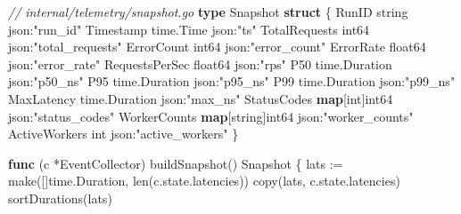 \documentclass[
]{article}
\newenvironment{Shaded}{}{}
\newcommand{\BuiltInTok}[1]{\textcolor[rgb]{0.00,0.50,0.00}{#1}}
\newcommand{\CommentTok}[1]{\textcolor[rgb]{0.38,0.63,0.69}{\textit{#1}}}
\newcommand{\DataTypeTok}[1]{\textcolor[rgb]{0.56,0.13,0.00}{#1}}
\newcommand{\KeywordTok}[1]{\textcolor[rgb]{0.00,0.44,0.13}{\textbf{#1}}}
\newcommand{\NormalTok}[1]{#1}
\newcommand{\OperatorTok}[1]{\textcolor[rgb]{0.40,0.40,0.40}{#1}}
\newcommand{\StringTok}[1]{\textcolor[rgb]{0.25,0.44,0.63}{#1}}
\begin{document}
\begin{Shaded}
\begin{Highlighting}[]
\CommentTok{// internal/telemetry/snapshot.go}
\KeywordTok{type}\NormalTok{ Snapshot }\KeywordTok{struct} \OperatorTok{\{}
\NormalTok{    RunID          }\DataTypeTok{string}            \StringTok{\textasciigrave{}json:"run\_id"\textasciigrave{}}
\NormalTok{    Timestamp      time}\OperatorTok{.}\NormalTok{Time         }\StringTok{\textasciigrave{}json:"ts"\textasciigrave{}}
\NormalTok{    TotalRequests  }\DataTypeTok{int64}             \StringTok{\textasciigrave{}json:"total\_requests"\textasciigrave{}}
\NormalTok{    ErrorCount     }\DataTypeTok{int64}             \StringTok{\textasciigrave{}json:"error\_count"\textasciigrave{}}
\NormalTok{    ErrorRate      }\DataTypeTok{float64}           \StringTok{\textasciigrave{}json:"error\_rate"\textasciigrave{}}
\NormalTok{    RequestsPerSec }\DataTypeTok{float64}           \StringTok{\textasciigrave{}json:"rps"\textasciigrave{}}
\NormalTok{    P50            time}\OperatorTok{.}\NormalTok{Duration     }\StringTok{\textasciigrave{}json:"p50\_ns"\textasciigrave{}}
\NormalTok{    P95            time}\OperatorTok{.}\NormalTok{Duration     }\StringTok{\textasciigrave{}json:"p95\_ns"\textasciigrave{}}
\NormalTok{    P99            time}\OperatorTok{.}\NormalTok{Duration     }\StringTok{\textasciigrave{}json:"p99\_ns"\textasciigrave{}}
\NormalTok{    MaxLatency     time}\OperatorTok{.}\NormalTok{Duration     }\StringTok{\textasciigrave{}json:"max\_ns"\textasciigrave{}}
\NormalTok{    StatusCodes    }\KeywordTok{map}\OperatorTok{[}\DataTypeTok{int}\OperatorTok{]}\DataTypeTok{int64}     \StringTok{\textasciigrave{}json:"status\_codes"\textasciigrave{}}
\NormalTok{    WorkerCounts   }\KeywordTok{map}\OperatorTok{[}\DataTypeTok{string}\OperatorTok{]}\DataTypeTok{int64}  \StringTok{\textasciigrave{}json:"worker\_counts"\textasciigrave{}}
\NormalTok{    ActiveWorkers  }\DataTypeTok{int}               \StringTok{\textasciigrave{}json:"active\_workers"\textasciigrave{}}
\OperatorTok{\}}

\KeywordTok{func} \OperatorTok{(}\NormalTok{c }\OperatorTok{*}\NormalTok{EventCollector}\OperatorTok{)}\NormalTok{ buildSnapshot}\OperatorTok{()}\NormalTok{ Snapshot }\OperatorTok{\{}
\NormalTok{    lats }\OperatorTok{:=} \BuiltInTok{make}\OperatorTok{([]}\NormalTok{time}\OperatorTok{.}\NormalTok{Duration}\OperatorTok{,} \BuiltInTok{len}\OperatorTok{(}\NormalTok{c}\OperatorTok{.}\NormalTok{state}\OperatorTok{.}\NormalTok{latencies}\OperatorTok{))}
    \BuiltInTok{copy}\OperatorTok{(}\NormalTok{lats}\OperatorTok{,}\NormalTok{ c}\OperatorTok{.}\NormalTok{state}\OperatorTok{.}\NormalTok{latencies}\OperatorTok{)}
\NormalTok{    sortDurations}\OperatorTok{(}\NormalTok{lats}\OperatorTok{)}


\end{Highlighting}
\end{Shaded}
\end{document}
